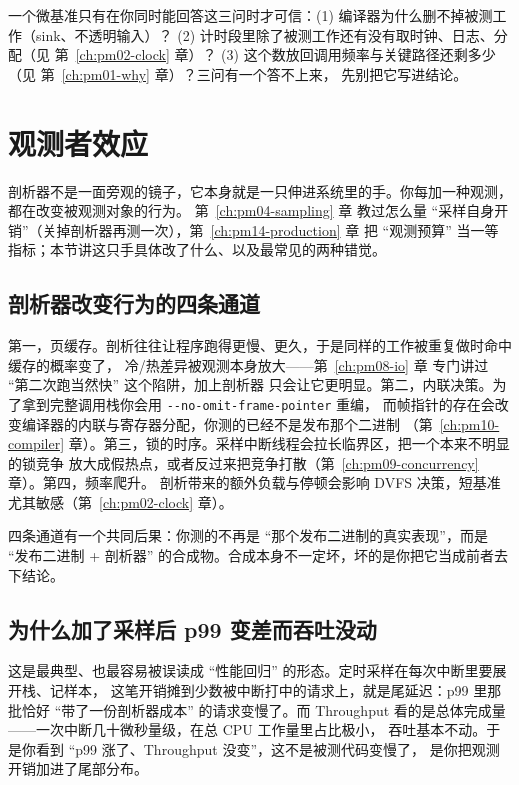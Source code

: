\documentclass[12pt,a4paper,fontset=fandol]{ctexbook}
\newcommand{\Opt}[1]{\texttt{-\/-#1}}
\newcommand{\Lang}[1]{\textsf{#1}}
\newcommand{\MThr}{\Lang{Throughput}}
\newcommand{\Mx}[1]{\textsf{#1}}
\begin{document}
\begin{guideline}[title={把 ``数是不是真的'' 这个问题前置}]
一个微基准只有在你同时能回答这三问时才可信：(1) 编译器为什么删不掉被测工作（sink、不透明输入）？
(2) 计时段里除了被测工作还有没有取时钟、日志、分配（见 第~\ref{ch:pm02-clock} 章）？
(3) 这个数放回调用频率与关键路径还剩多少（见 第~\ref{ch:pm01-why} 章）？三问有一个答不上来，
先别把它写进结论。
\end{guideline}

\section{观测者效应}

剖析器不是一面旁观的镜子，它本身就是一只伸进系统里的手。你每加一种观测，都在改变被观测对象的行为。
第~\ref{ch:pm04-sampling} 章 教过怎么量 ``采样自身开销''（关掉剖析器再测一次），第~\ref{ch:pm14-production} 章
把 ``观测预算'' 当一等指标；本节讲这只手具体改了什么、以及最常见的两种错觉。

\subsection{剖析器改变行为的四条通道}

第一，页缓存。剖析往往让程序跑得更慢、更久，于是同样的工作被重复做时命中缓存的概率变了，
冷/热差异被观测本身放大——第~\ref{ch:pm08-io} 章 专门讲过 ``第二次跑当然快'' 这个陷阱，加上剖析器
只会让它更明显。第二，内联决策。为了拿到完整调用栈你会用 \Opt{no-omit-frame-pointer} 重编，
而帧指针的存在会改变编译器的内联与寄存器分配，你测的已经不是发布那个二进制
（第~\ref{ch:pm10-compiler} 章）。第三，锁的时序。采样中断线程会拉长临界区，把一个本来不明显的锁竞争
放大成假热点，或者反过来把竞争打散（第~\ref{ch:pm09-concurrency} 章）。第四，频率爬升。
剖析带来的额外负载与停顿会影响 DVFS 决策，短基准尤其敏感（第~\ref{ch:pm02-clock} 章）。

四条通道有一个共同后果：你测的不再是 ``那个发布二进制的真实表现''，而是 ``发布二进制 + 剖析器''
的合成物。合成本身不一定坏，坏的是你把它当成前者去下结论。

\subsection{为什么加了采样后 \Mx{p99} 变差而吞吐没动}

这是最典型、也最容易被误读成 ``性能回归'' 的形态。定时采样在每次中断里要展开栈、记样本，
这笔开销摊到少数被中断打中的请求上，就是尾延迟：\Mx{p99} 里那批恰好 ``带了一份剖析器成本''
的请求变慢了。而 \MThr{} 看的是总体完成量——一次中断几十微秒量级，在总 CPU 工作量里占比极小，
吞吐基本不动。于是你看到 ``\Mx{p99} 涨了、\MThr{} 没变''，这不是被测代码变慢了，
是你把观测开销加进了尾部分布。
\end{document}
